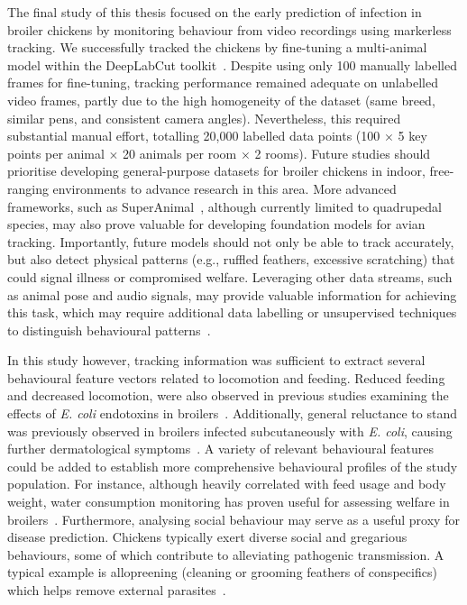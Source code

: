 The final study of this thesis focused on the early prediction of infection in broiler chickens by monitoring behaviour from video recordings using markerless tracking. We successfully tracked the chickens by fine-tuning a multi-animal model within the DeepLabCut toolkit~\cite{mathis2018, lauer2022}. Despite using only 100 manually labelled frames for fine-tuning, tracking performance remained adequate on unlabelled video frames, partly due to the high homogeneity of the dataset (same breed, similar pens, and consistent camera angles). Nevertheless, this required substantial manual effort, totalling 20,000 labelled data points (100 $\times$ 5 key points per animal $\times$ 20 animals per room $\times$ 2 rooms). Future studies should prioritise developing general-purpose datasets for broiler chickens in indoor, free-ranging environments to advance research in this area. More advanced frameworks, such as SuperAnimal~\cite{ye2024}, although currently limited to quadrupedal species, may also prove valuable for developing foundation models for avian tracking. Importantly, future models should not only be able to track accurately, but also detect physical patterns (e.g., ruffled feathers, excessive scratching) that could signal illness or compromised welfare. Leveraging other data streams, such as animal pose and audio signals, may provide valuable information for achieving this task, which may require additional data labelling or unsupervised techniques to distinguish behavioural patterns~\cite{todd2017, gunel2019}.

In this study however, tracking information was sufficient to extract several behavioural feature vectors related to locomotion and feeding. Reduced feeding and decreased locomotion, were also observed in previous studies examining the effects of \textit{E. coli} endotoxins in broilers~\cite{johnson1993, cheng2004, gregory2009}. Additionally, general reluctance to stand was previously observed in broilers infected subcutaneously with \textit{E. coli}, causing further dermatological symptoms~\cite{jonare2024}. A variety of relevant behavioural features could be added to establish more comprehensive behavioural profiles of the study population. For instance, although heavily correlated with feed usage and body weight, water consumption monitoring has proven useful for assessing welfare in broilers~\cite{manning2007}. Furthermore, analysing social behaviour may serve as a useful proxy for disease prediction. Chickens typically exert diverse social and gregarious behaviours, some of which contribute to alleviating pathogenic transmission. A typical example is allopreening (cleaning or grooming feathers of conspecifics) which helps remove external parasites~\cite{bush2018, jackson2025}. 
 
